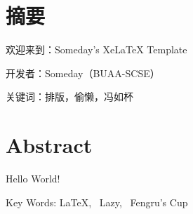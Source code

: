 \xiaosi
\section*{摘要}

欢迎来到：Someday's XeLaTeX Template

开发者：Someday（BUAA-SCSE）

关键词：排版，偷懒，冯如杯


\clearpage

\section*{Abstract}

Hello World!

Key Words: \LaTeX, \ Lazy, \ Fengru's Cup

\clearpage
